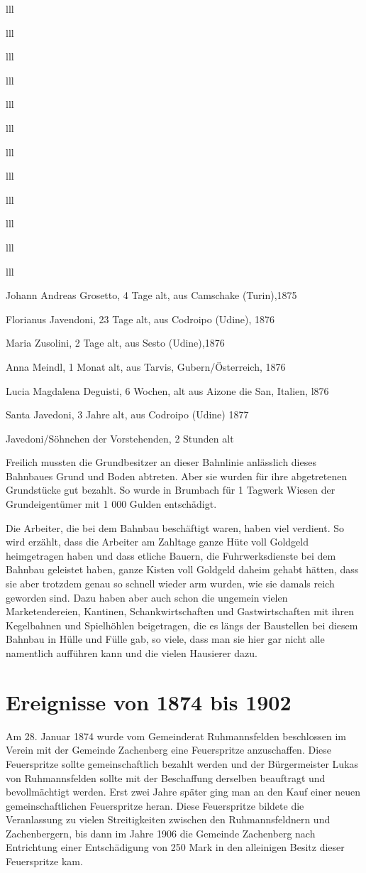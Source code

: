 \documentclass[12pt,a4pager]{book}
\begin{document}
\begin{tabuluar}{lll}
\begin{tabuluar}{lll}
\begin{tabuluar}{lll}
\begin{tabuluar}{lll}
\begin{tabuluar}{lll}
\begin{tabuluar}{lll}
\begin{tabuluar}{lll}
\begin{tabuluar}{lll}
\begin{tabuluar}{lll}
\begin{tabuluar}{lll}
\begin{tabuluar}{lll}
\begin{tabuluar}{lll}
\begin{compactitem}
\item Johann Andreas Grosetto, 4 Tage alt, aus Camschake (Turin),1875
\item Florianus Javendoni, 23 Tage alt, aus Codroipo (Udine), 1876
\item Maria Zusolini, 2 Tage alt, aus Sesto (Udine),1876
\item Anna Meindl, 1 Monat alt, aus Tarvis, Gubern/Österreich, 1876
\item Lucia Magdalena Deguisti, 6 Wochen, alt aus Aizone die San, Italien, l876
\item Santa Javedoni, 3 Jahre alt, aus Codroipo (Udine) 1877
\item Javedoni/Söhnchen der Vorstehenden, 2 Stunden alt
\end{compactitem}

Freilich mussten die Grundbesitzer an dieser Bahnlinie anlässlich dieses
Bahnbaues Grund und Boden abtreten. Aber sie wurden für ihre abgetretenen
Grundstücke gut bezahlt. So wurde in Brumbach für 1 Tagwerk Wiesen der
Grundeigentümer mit 1 000 Gulden entschädigt.

Die Arbeiter, die bei dem Bahnbau beschäftigt waren, haben viel verdient. So
wird erzählt, dass die Arbeiter am Zahltage ganze Hüte voll Goldgeld
heimgetragen haben und dass etliche Bauern, die Fuhrwerksdienste bei dem Bahnbau
geleistet haben, ganze Kisten voll Goldgeld daheim gehabt hätten, dass sie aber
trotzdem genau so schnell wieder arm wurden, wie sie damals reich geworden sind.
Dazu haben aber auch schon die ungemein vielen Marketendereien, Kantinen,
Schankwirtschaften und Gastwirtschaften mit ihren Kegelbahnen und Spielhöhlen
beigetragen, die es längs der Baustellen bei diesem Bahnbau in Hülle und Fülle
gab, so viele, dass man sie hier gar nicht alle namentlich aufführen kann und
die vielen Hausierer dazu.

\section{Ereignisse von 1874 bis 1902}

Am 28. Januar 1874 wurde vom Gemeinderat Ruhmannsfelden beschlossen im Verein
mit der Gemeinde Zachenberg eine Feuerspritze anzuschaffen. Diese Feuerspritze
sollte gemeinschaftlich bezahlt werden und der Bürgermeister Lukas von
Ruhmannsfelden sollte mit der Beschaffung derselben beauftragt und
bevollmächtigt werden. Erst zwei Jahre später ging man an den Kauf einer neuen
gemeinschaftlichen Feuerspritze heran. Diese Feuerspritze bildete die
Veranlassung zu vielen Streitigkeiten zwischen den Ruhmannsfeldnern und
Zachenbergern, bis dann im Jahre 1906 die Gemeinde Zachenberg nach Entrichtung
einer Entschädigung von 250 Mark in den alleinigen Besitz dieser Feuerspritze
kam.


\end{tabuluar}
\end{tabuluar}
\end{tabuluar}
\end{tabuluar}
\end{tabuluar}
\end{tabuluar}
\end{tabuluar}
\end{tabuluar}
\end{tabuluar}
\end{tabuluar}
\end{tabuluar}
\end{tabuluar}
\end{document}
